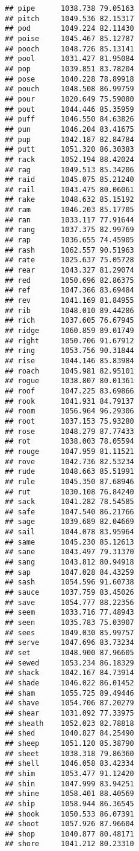 \documentclass[
]{article}
\begin{document}
\begin{verbatim}
## pipe      1038.738 79.05163
## pitch     1049.536 82.15317
## pod       1049.224 82.11430
## poise     1045.467 85.12787
## pooch     1048.726 85.13141
## pool      1031.427 81.95084
## pop       1039.851 83.78204
## pose      1040.228 78.89918
## pouch     1048.508 86.99759
## pour      1020.649 75.59080
## pout      1044.446 85.35959
## puff      1046.550 84.63826
## pun       1046.204 83.41675
## pup       1042.187 82.84784
## putt      1051.320 86.30383
## rack      1052.194 88.42024
## rag       1049.513 85.34206
## raid      1045.075 85.21240
## rail      1043.475 80.06061
## rake      1048.632 85.15192
## ram       1046.203 85.17705
## ran       1033.117 77.91644
## rang      1037.375 82.99769
## rap       1036.655 74.45905
## rash      1062.557 90.51963
## rate      1025.637 75.05728
## rear      1043.327 81.29074
## red       1050.696 82.86375
## ref       1047.366 83.69484
## rev       1041.169 81.84955
## rib       1048.010 89.44286
## rich      1037.605 76.67945
## ridge     1060.859 89.01749
## right     1050.706 91.67912
## ring      1053.756 90.31844
## rise      1044.146 85.83984
## roach     1045.981 82.95101
## rogue     1038.807 80.01361
## roof      1047.225 83.69866
## rook      1041.931 84.79137
## room      1056.964 96.29306
## root      1037.153 75.93280
## rose      1048.279 87.77433
## rot       1038.003 78.05594
## rouge     1047.959 81.11521
## rove      1042.736 82.53234
## rude      1048.663 85.51991
## rule      1045.350 87.68946
## rut       1030.108 76.84240
## sack      1041.282 78.54585
## safe      1047.540 86.21766
## sage      1039.689 82.04669
## sail      1044.078 83.95964
## same      1045.230 85.12613
## sane      1043.497 79.31370
## sang      1043.812 80.94918
## sap       1047.028 84.43259
## sash      1054.596 91.60738
## sauce     1037.759 83.45026
## save      1054.777 88.22356
## seem      1033.716 77.48943
## seen      1035.783 75.03907
## sees      1049.030 85.99757
## serve     1047.696 83.73234
## set       1048.900 87.96605
## sewed     1053.234 86.18329
## shack     1042.167 84.73914
## shade     1046.022 86.01452
## sham      1055.725 89.49446
## shave     1054.706 87.20279
## shear     1031.092 77.33975
## sheath    1052.023 82.78818
## shed      1040.827 84.25490
## sheep     1051.120 85.38790
## sheet     1038.318 79.86360
## shell     1046.058 83.42334
## shim      1053.477 91.12420
## shin      1047.999 83.94251
## shine     1058.401 88.40569
## ship      1058.944 86.36545
## shook     1050.533 86.07391
## shoot     1057.926 87.96604
## shop      1040.877 80.48171
## shore     1041.212 80.23310

\end{verbatim}
\end{document}
